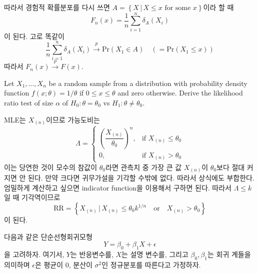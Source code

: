 \documentclass[answers]{exam}
\begin{document}
\begin{questions}
\begin{solution}
\begin{equation}
     \end{equation}
    따라서 경험적 확률분포를 다시 쓰면 $A=\left\{X\,|\,X\leq x\text{ for some $x$}\right\}$이라 할 때
     \begin{equation}
      F_{n}\left(x\right)=\dfrac{1}{n}\sum_{i=1}^{n}\delta_{A}\left(X_{i}\right)
     \end{equation}
     이 된다. 고로 똑같이
     \begin{equation}
      \dfrac{1}{n}\sum_{i=1}^{n}\delta_{A}\left(X_{i}\right)\xrightarrow{p}\mathrm{Pr}\left(X_{1}\in A\right)\quad \left(=\mathrm{Pr}\left(X_{1}\leq x\right)\right)
     \end{equation}
     따라서 $F_{n}\left(x\right)\xrightarrow{p}F\left(x\right)$.
   \end{solution}
   \question
   Let $X_{1},\ldots,X_{n}$ be a random sample from a distribution with probability density function $f\left(x;\theta\right)=1/\theta$ if $0\leq x \leq \theta$ and zero otherwise. Derive the likelihood ratio test of size $\alpha$ of $H_{0}:\theta=\theta_{0}$ vs $H_{1}:\theta\neq \theta_{0}$.
   \begin{solution}
    MLE는 $X_{\left(n\right)}$이므로 가능도비는
    \begin{equation}
      \Lambda = \begin{cases}\left(\dfrac{X_{\left(n\right)}}{\theta_{0}}\right)^{n}, & \text{if $X_{\left(n\right)}\leq \theta_{0}$}\\0,&\text{if $X_{\left(n\right)}>\theta_{0}$} \end{cases}
    \end{equation}
    이는 당연한 것이 모수의 참값이 $\theta_{0}$라면 관측치 중 가장 큰 값 $X_{\left(n\right)}$이 $\theta_{0}$보다 절대 커지면 안 된다. 만약 크다면 귀무가설을 기각할 수밖에 없다. 따라서 상식에도 부합한다. 엄밀하게 계산하고 싶으면 indicator function을 이용해서 구하면 된다. 따라서 $\Lambda \leq k$일 때 기각역이므로
    \begin{equation}
      \mathrm{RR}=\left\{X_{\left(n\right)}\,|\, X_{\left(n\right)}\leq \theta_{0}k^{1/n}\quad \text{or}\quad X_{\left(n\right)}>\theta_{0}\right\}
    \end{equation}
    이 된다.
   \end{solution}
   \question
   다음과 같은 단순선형회귀모형
   $$
    Y=\beta_{0}+\beta_{1}X+\epsilon
   $$
   을 고려하자. 여기서, $Y$는 반응변수를, $X$는 설명 변수를, 그리고 $\beta_{0},\beta_{1}$는 회귀 계들을 의미하며 $\epsilon$은 평균이 $0$, 분산이 $\sigma^{2}$인 정규분포를 따른다고 가정하자.
   \begin{enumerate}[(a)]

\end{enumerate}
\end{questions}
\end{document}

